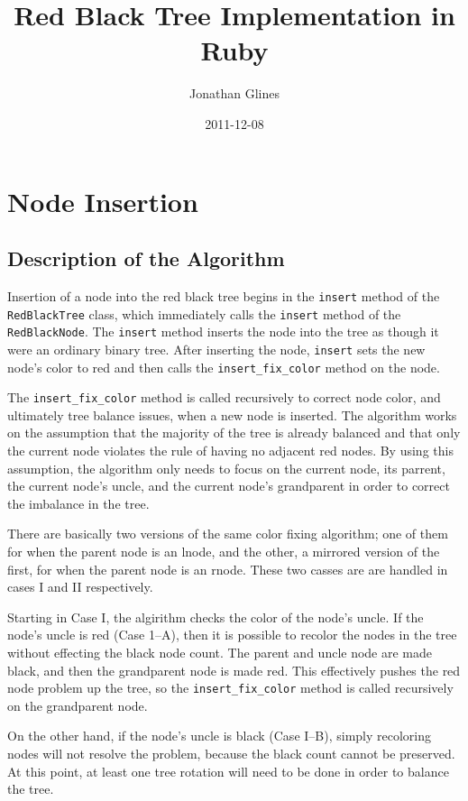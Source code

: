 \documentclass[12pt, letterpaper]{article}
\title{Red Black Tree Implementation in Ruby}
\author{Jonathan Glines}
\date{2011-12-08}
\begin{document}
\maketitle
\section{Node Insertion}
\subsection{Description of the Algorithm}
Insertion of a node into the red black tree begins in the \texttt{insert} method of the \texttt{RedBlackTree} class, which immediately calls the \texttt{insert} method of the \texttt{RedBlackNode}. The \texttt{insert} method inserts the node into the tree as though it were an ordinary binary tree. After inserting the node, \texttt{insert} sets the new node's color to red and then calls the \texttt{insert\_fix\_color} method on the node.

The \texttt{insert\_fix\_color} method is called recursively to correct node color, and ultimately tree balance issues, when a new node is inserted. The algorithm works on the assumption that the majority of the tree is already balanced and that only the current node violates the rule of having no adjacent red nodes. By using this assumption, the algorithm only needs to focus on the current node, its parrent, the current node's uncle, and the current node's grandparent in order to correct the imbalance in the tree.

There are basically two versions of the same color fixing algorithm; one of them for when the parent node is an lnode, and the other, a mirrored version of the first, for when the parent node is an rnode. These two casses are are handled in cases I and II respectively.

Starting in Case I, the algirithm checks the color of the node's uncle. If the node's uncle is red (Case 1--A), then it is possible to recolor the nodes in the tree without effecting the black node count. The parent and uncle node are made black, and then the grandparent node is made red. This effectively pushes the red node problem up the tree, so the \texttt{insert\_fix\_color} method is called recursively on the grandparent node.

On the other hand, if the node's uncle is black (Case I--B), simply recoloring nodes will not resolve the problem, because the black count cannot be preserved. At this point, at least one tree rotation will need to be done in order to balance the tree.
\end{document}
